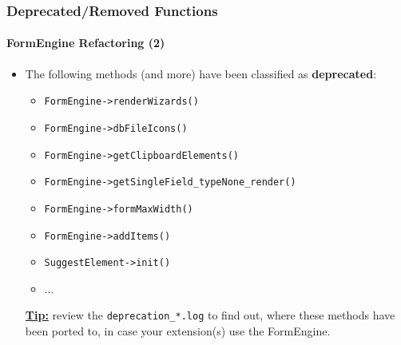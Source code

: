 \begin{frame}[fragile]
	\frametitle{Deprecated/Removed Functions}
	\framesubtitle{FormEngine Refactoring (2)}

	\begin{itemize}

		\item The following methods (and more) have been classified as \textbf{deprecated}:

			\begin{itemize}
				\item \texttt{FormEngine->renderWizards()}
				\item \texttt{FormEngine->dbFileIcons()}
				\item \texttt{FormEngine->getClipboardElements()}
				\item \texttt{FormEngine->getSingleField\_typeNone\_render()}
				\item \texttt{FormEngine->formMaxWidth()}
				\item \texttt{FormEngine->addItems()}
				\item \texttt{SuggestElement->init()}
				\item ...
			\end{itemize}

		\small
			\underline{\textbf{Tip:}}
			review the \texttt{deprecation\_*.log} to find out, where these methods
			have been ported to, in case your extension(s) use the FormEngine.
		\normalsize

	\end{itemize}

\end{frame}


